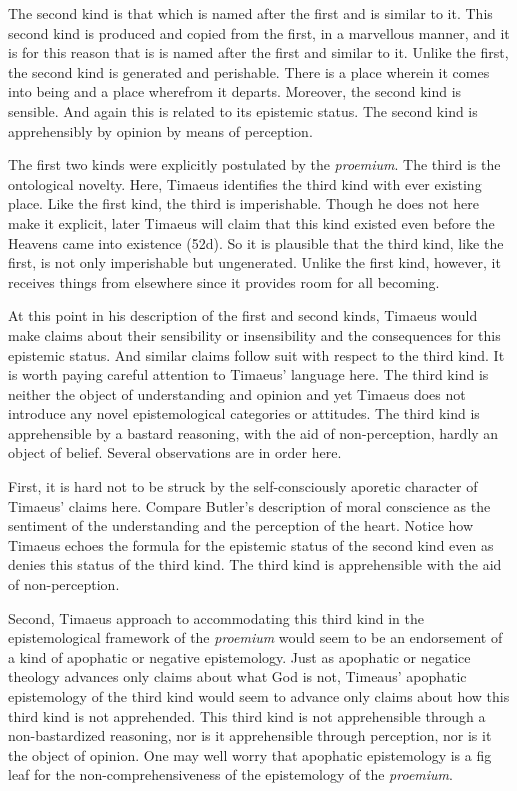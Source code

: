 The second kind is that which is named after the first and is similar to it. This second kind is produced and copied from the first, in a marvellous manner, and it is for this reason that is is named after the first and similar to it. Unlike the first, the second kind is generated and perishable. There is a place wherein it comes into being and a place wherefrom it departs. Moreover, the second kind is sensible. And again this is related to its epistemic status. The second kind is apprehensibly by opinion by means of perception. 

The first two kinds were explicitly postulated by the \emph{proemium}. The third is the ontological novelty. Here, Timaeus identifies the third kind with ever existing place. Like the first kind, the third is imperishable. Though he does not here make it explicit, later Timaeus will claim that this kind existed even before the Heavens came into existence (52d). So it is plausible that the third kind, like the first, is not only imperishable but ungenerated. Unlike the first kind, however, it receives things from elsewhere since it provides room for all becoming.

At this point in his description of the first and second kinds, Timaeus would make claims about their sensibility or insensibility and the consequences for this epistemic status. And similar claims follow suit with respect to the third kind. It is worth paying careful attention to Timaeus' language here. The third kind is neither the object of understanding and opinion and yet Timaeus does not introduce any novel epistemological categories or attitudes. The third kind is apprehensible by a bastard reasoning, with the aid of non-perception, hardly an object of belief. Several observations are in order here.

First, it is hard not to be struck by the self-consciously aporetic character of Timaeus' claims here. Compare Butler's description of moral conscience as the sentiment of the understanding and the perception of the heart. Notice how Timaeus echoes the formula for the epistemic status of the second kind even as denies this status of the third kind. The third kind is apprehensible with the aid of non-perception.

Second, Timaeus approach to accommodating this third kind in the epistemological framework of the \emph{proemium} would seem to be an endorsement of a kind of apophatic or negative epistemology. Just as apophatic or negatice theology advances only claims about what God is not, Timeaus' apophatic epistemology of the third kind would seem to advance only claims about how this third kind is not apprehended. This third kind is not apprehensible through a non-bastardized reasoning, nor is it apprehensible through perception, nor is it the object of opinion. One may well worry that apophatic epistemology is a fig leaf for the non-comprehensiveness of the epistemology of the \emph{proemium}.

